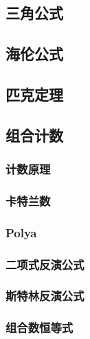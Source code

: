 \documentclass[twocolumn,a4]{article}
\newcommand{\addcpp}[1]{}
\begin{document}
	\subsection{三角公式}
	\subsection{海伦公式}
	\subsection{匹克定理}
	\subsection{组合计数}
		\subsubsection{计数原理}
		\subsubsection{卡特兰数}
		\subsubsection{Polya}
		\subsubsection{二项式反演公式}
		\subsubsection{斯特林反演公式}
		\subsubsection{组合数恒等式}
			
\end{document}
